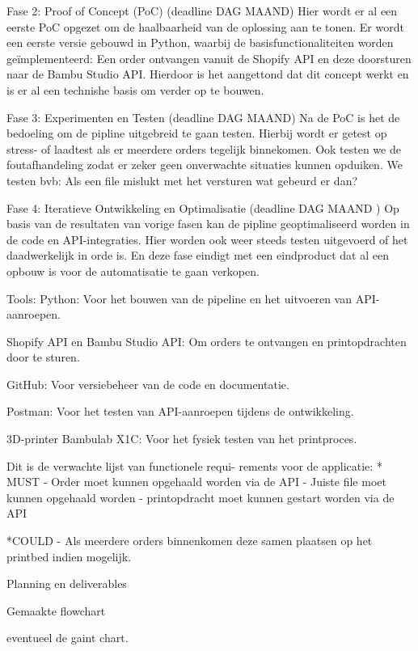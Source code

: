 Fase 2: Proof of Concept (PoC) (deadline DAG MAAND)
Hier wordt er al een eerste PoC opgezet om de haalbaarheid van de oplossing aan te tonen. Er wordt een eerste versie gebouwd in Python, waarbij de basisfunctionaliteiten worden geïmplementeerd: Een order ontvangen vanuit de Shopify API en deze doorsturen naar de Bambu Studio API. Hierdoor is het aangettond dat dit concept werkt en is er al een technishe basis om verder op te bouwen.

Fase 3: Experimenten en Testen (deadline DAG MAAND)
Na de PoC is het de bedoeling om de pipline uitgebreid te gaan testen. Hierbij wordt er getest op stress- of laadtest als er meerdere orders tegelijk binnekomen. Ook testen we de foutafhandeling zodat er zeker geen onverwachte situaties kunnen opduiken. We testen bvb: Als een file mislukt met het versturen wat gebeurd er dan?

Fase 4: Iteratieve Ontwikkeling en Optimalisatie (deadline DAG MAAND )
Op basis van de resultaten van vorige fasen kan de pipline geoptimaliseerd worden in de code en API-integraties. Hier worden ook weer steeds testen uitgevoerd of het daadwerkelijk in orde is. En deze fase eindigt met een eindproduct dat al een opbouw  is voor de automatisatie te gaan verkopen.  

Tools:
Python: Voor het bouwen van de pipeline en het uitvoeren van API-aanroepen.

Shopify API en Bambu Studio API: Om orders te ontvangen en printopdrachten door te sturen.

GitHub: Voor versiebeheer van de code en documentatie.

Postman: Voor het testen van API-aanroepen tijdens de ontwikkeling.

3D-printer Bambulab X1C: Voor het fysiek testen van het printproces.

Dit is de verwachte lijst van functionele requi-
rements voor de applicatie:
* MUST
- Order moet kunnen opgehaald worden  via de API
- Juiste file moet kunnen opgehaald worden
- printopdracht moet kunnen gestart worden via de API

*COULD
- Als meerdere orders binnenkomen deze samen plaatsen op het printbed indien mogelijk.


Planning en deliverables

Gemaakte flowchart

eventueel de gaint chart.


